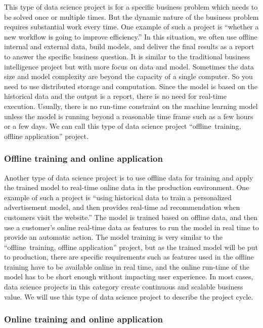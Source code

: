 \documentclass[12pt,]{krantz}
\theoremstyle{definition}
\theoremstyle{definition}
\theoremstyle{definition}
\theoremstyle{remark}
\begin{document}
This type of data science project is for a specific business problem
which needs to be solved once or multiple times. But the dynamic nature
of the business problem requires substantial work every time. One
example of such a project is ``whether a new workflow is going to
improve efficiency.'' In this situation, we often use offline internal
and external data, build models, and deliver the final results as a
report to answer the specific business question. It is similar to the
traditional business intelligence project but with more focus on data
and model. Sometimes the data size and model complexity are beyond the
capacity of a single computer. So you need to use distributed storage
and computation. Since the model is based on the historical data and the
output is a report, there is no need for real-time execution. Usually,
there is no run-time constraint on the machine learning model unless the
model is running beyond a reasonable time frame such as a few hours or a
few days. We can call this type of data science project
``offline~training, offline application'' project.

\subsubsection{Offline training and online
application}\label{offline-training-and-online-application}

Another type of data science project is to use offline data for training
and apply the trained model to real-time online data in the production
environment. One example of such a project is ``using historical data to
train a personalized advertisement model, and then provides real-time ad
recommendation when customers visit the website.'' The model is trained
based on offline data, and then use a customer's online real-time data
as features to run the model in real time to provide an automatic
action. The model training is very similar to the ``offline~training,
offline application'' project, but as the trained model will be put to
production, there are specific requirements such as features used in the
offline training have to be available online in real time, and the
online run-time of the model has to be short enough without impacting
user experience. In most cases, data science projects in this category
create continuous and scalable business value. We will use this type of
data science project to describe the project cycle.

\subsubsection{Online training and online
application}\label{online-training-and-online-application}
\end{document}
